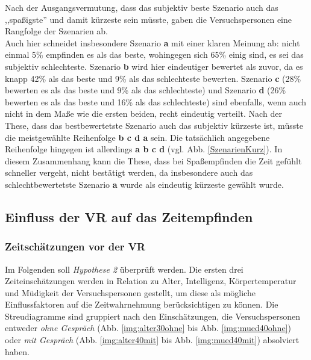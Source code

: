 \documentclass{Paper}
\begin{document}
Nach der Ausgangsvermutung, dass das subjektiv beste Szenario auch das ,,spaßigste'' und damit kürzeste sein müsste, gaben die Versuchspersonen eine Rangfolge der Szenarien ab.\\
Auch hier schneidet insbesondere Szenario \textbf{a} mit einer klaren Meinung ab: nicht einmal 5\% empfinden es als das beste, wohingegen sich 65\% einig sind, es sei das subjektiv schlechteste. Szenario \textbf{b} wird hier eindeutiger bewertet als zuvor, da es knapp 42\% als das beste und 9\% als das schlechteste bewerten. Szenario \textbf{c} (28\% bewerten es als das beste und 9\% als das schlechteste) und Szenario \textbf{d} (26\% bewerten es als das beste und 16\% als das schlechteste) sind ebenfalls, wenn auch nicht in dem Maße wie die ersten beiden, recht eindeutig verteilt. 
Nach der These, dass das bestbewertetste Szenario auch das subjektiv kürzeste ist, müsste die meistgewählte Reihenfolge \textbf{b c d a} sein. 
Die tatsächlich angegebene Reihenfolge hingegen ist allerdings \textbf{a b c d} (vgl. Abb. \ref{SzenarienKurz}).
In diesem Zusammenhang kann die These, dass bei Spaßempfinden die Zeit gefühlt schneller vergeht, nicht bestätigt werden, da insbesondere auch das schlechtbewertetste Szenario \textbf{a} wurde als eindeutig kürzeste gewählt wurde. 

\subsection{Einfluss der VR auf das Zeitempfinden}
\subsubsection{Zeitschätzungen vor der VR}
Im Folgenden soll \textit{Hypothese 2} überprüft werden. Die ersten drei Zeiteinschätzungen werden in Relation zu  Alter, Intelligenz, Körpertemperatur und Müdigkeit der Versuchspersonen gestellt, um diese als mögliche Einflussfaktoren auf die Zeitwahrnehmung berücksichtigen zu können. Die Streudiagramme sind gruppiert nach den Einschätzungen, die Versuchspersonen entweder \textit{ohne Gespräch} (Abb. \ref{img:alter30ohne} bis Abb. \ref{img:mued40ohne}) oder \textit{mit Gespräch} (Abb. \ref{img:alter40mit} bis Abb. \ref{img:mued40mit}) absolviert haben.
\end{document}
